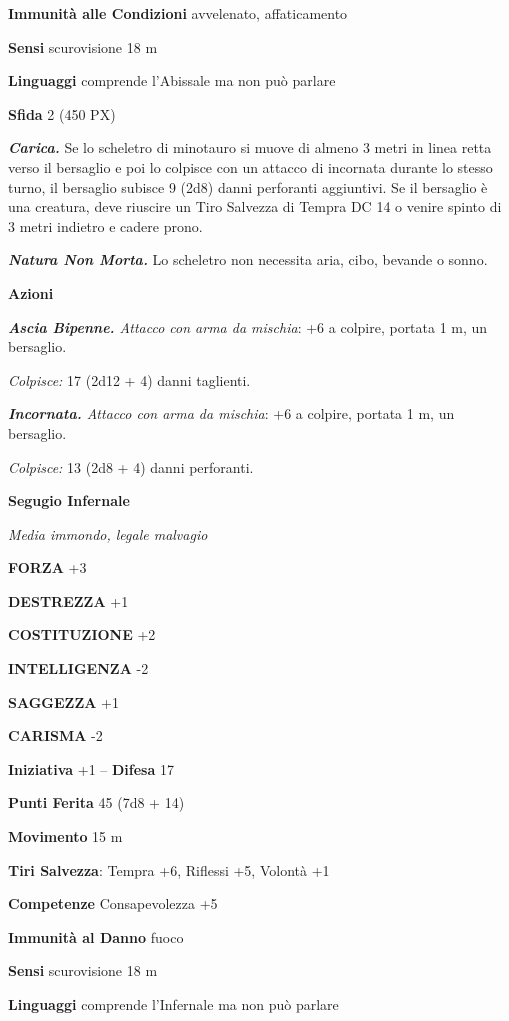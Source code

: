 \begin{multicols}{2}
\textbf{Immunità alle Condizioni} avvelenato, affaticamento

\textbf{Sensi} scurovisione 18 m

\textbf{Linguaggi} comprende l'Abissale ma non può parlare

\textbf{Sfida} 2 (450 PX)

\textit{\textbf{Carica.}} Se lo scheletro di minotauro si muove di almeno 3 metri in linea retta verso il bersaglio e poi lo colpisce con un attacco di incornata durante lo stesso turno, il bersaglio subisce 9 (2d8) danni perforanti aggiuntivi. Se il bersaglio è una creatura, deve riuscire un Tiro Salvezza di Tempra DC 14 o venire spinto di 3 metri indietro e cadere prono.

\textit{\textbf{Natura Non Morta.}} Lo scheletro non necessita aria, cibo, bevande o sonno.

\textbf{Azioni}

\textit{\textbf{Ascia Bipenne.} Attacco con arma da mischia}: +6 a colpire, portata 1 m, un bersaglio.

\textit{Colpisce:} 17 (2d12 + 4) danni taglienti.

\textit{\textbf{Incornata.} Attacco con arma da mischia}: +6 a colpire, portata 1 m, un bersaglio.

\textit{Colpisce:} 13 (2d8 + 4) danni perforanti.

\medskip{}\textbf{Segugio Infernale}

\textit{Media immondo, legale malvagio}

\textbf{FORZA} +3

\textbf{DESTREZZA} +1

\textbf{COSTITUZIONE} +2

\textbf{INTELLIGENZA} -2

\textbf{SAGGEZZA} +1

\textbf{CARISMA} -2

\textbf{Iniziativa} +1 -- \textbf{Difesa} 17

\textbf{Punti Ferita} 45 (7d8 + 14)

\textbf{Movimento} 15 m

\textbf{Tiri Salvezza}: Tempra +6, Riflessi +5, Volontà +1

\textbf{Competenze} Consapevolezza +5

\textbf{Immunità al Danno} fuoco

\textbf{Sensi} scurovisione 18 m

\textbf{Linguaggi} comprende l'Infernale ma non può parlare


\end{multicols}
